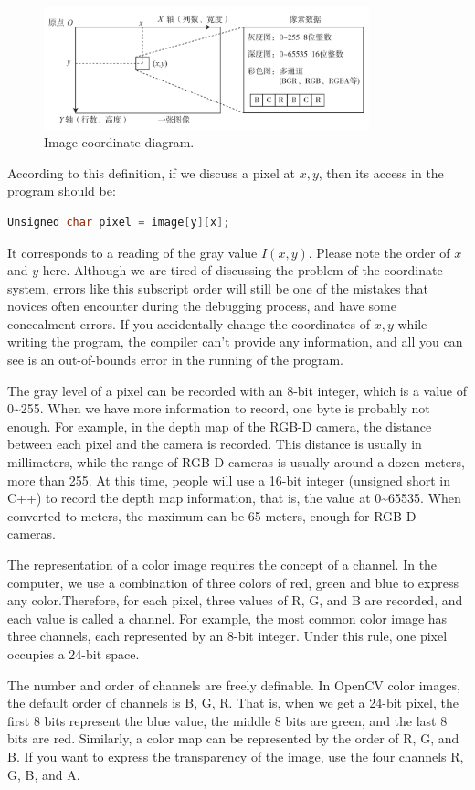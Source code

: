 \begin{figure}[!t]
	\centering
	\includegraphics[width=0.84\textwidth]{chapter05/resources/cameraModel/image.pdf}
	\caption{Image coordinate diagram. }
	\label{fig:imagesInComputer}
\end{figure}

According to this definition, if we discuss a pixel at $x,y$, then its access in the program should be:

\begin{lstlisting}[language=C++, caption=Access Image Pixels]
Unsigned char pixel = image[y][x];
\end{lstlisting}

It corresponds to a reading of the gray value $I(x,y)$. Please note the order of $x$ and $y$ here. Although we are tired of discussing the problem of the coordinate system, errors like this subscript order will still be one of the mistakes that novices often encounter during the debugging process, and have some concealment errors. If you accidentally change the coordinates of $x,y$ while writing the program, the compiler can't provide any information, and all you can see is an out-of-bounds error in the running of the program.

The gray level of a pixel can be recorded with an 8-bit integer, which is a value of 0\textasciitilde255. When we have more information to record, one byte is probably not enough. For example, in the depth map of the RGB-D camera, the distance between each pixel and the camera is recorded. This distance is usually in millimeters, while the range of RGB-D cameras is usually around a dozen meters, more than 255. At this time, people will use a 16-bit integer (unsigned short in C++) to record the depth map information, that is, the value at 0\textasciitilde65535. When converted to meters, the maximum can be 65 meters, enough for RGB-D cameras.

The representation of a color image requires the concept of a channel.
In the computer, we use a combination of three colors of red, green and blue to express any color.Therefore, for each pixel, three values of R, G, and B are recorded, and each value is called a channel. For example, the most common color image has three channels, each represented by an 8-bit integer. Under this rule, one pixel occupies a 24-bit space.

The number and order of channels are freely definable. In OpenCV color images, the default order of channels is B, G, R. That is, when we get a 24-bit pixel, the first 8 bits represent the blue value, the middle 8 bits are green, and the last 8 bits are red. Similarly, a color map can be represented by the order of R, G, and B. If you want to express the transparency of the image, use the four channels R, G, B, and A.
